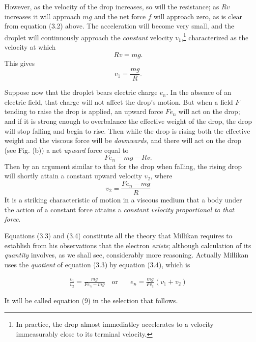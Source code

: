 However, as the velocity of the drop increases, so will the resistance;
as $Rv$ increases it will approach $mg$ and the net force
$f$ will approach zero, as is clear from equation (3.2) above. The
acceleration will become very small, and the droplet will continuously 
approach the \emph{constant} velocity $v_1$,\footnote{In practice, the drop
almost immediatley accelerates to a velocity immeasurably close to its terminal 
velocity.} characterized as the velocity at which
\begin{equation*}
Rv = mg.
\end{equation*}
%
This gives
\begin{equation*}\tag{3.3}
v_1 = \frac{mg}{R}.
\end{equation*}

Suppose now that the droplet bears electric charge $e_n$. In the
absence of an electric field, that charge will not affect the drop's
motion. But when a field $F$ tending to raise the drop is applied,
an upward force $Fe_n$ will act on the drop; and if it is strong
enough to overbalance the effective weight of the drop, the drop will
stop falling and begin to rise. Then while the drop is rising both the
effective weight and the viscous force will be \emph{downwards}, and
there will act on the drop (see Fig. (b)) a net \emph{upward} force
equal to
\begin{equation*}
Fe_n - mg - Rv.
\end{equation*}
Then by an argument similar to that for the drop when falling, the
rising drop will shortly attain a constant upward velocity $v_2$,
where
\begin{equation*}\tag{3.4}
v_2=\frac{Fe_n - mg}{R}
\end{equation*}
It is a striking characteristic of motion in a viscous medium that a
body under the action of a constant force attains a \emph{constant
velocity proportional to that force}.

Equations (3.3) and (3.4) constitute all the theory that Millikan
requires to establish from his observations that the electron
\emph{exists}; although calculation of its \emph{quantity} involves, as
we shall see, considerably more reasoning. Actually Millikan uses the
\emph{quotient} of equation (3.3) by equation (3.4), which is
\begin{center}
\begin{align*}\tag{1}
\frac{v_1}{v_2} = \frac{mg}{Fe_n - mg} \quad\text{or}\quad & e_n = \frac{mg}{Fv_1}(v_1 + v_2)
\end{align*}
\end{center}
It will be called equation (9) in the selection that follows.

